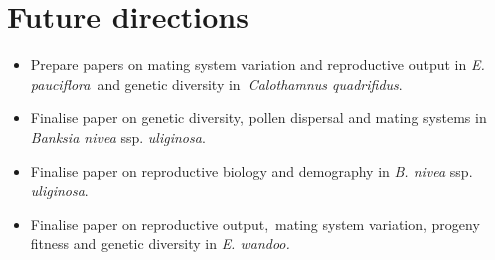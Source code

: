 \documentclass[version=last,
    paper=a4, %
    10pt, %
    usenames,
    dvipsnames,
    oneside, %
    headings=openany, %
    DIV=15 %
]{scrbook}
\begin{document}
\section*{Future directions}
\begin{itemize}
\itemsep1pt\parskip0pt
\item
  Prepare papers on mating system variation and reproductive output in
  \emph{E. pauciflora}~and genetic diversity in~\emph{Calothamnus
  quadrifidus}.
\item
  Finalise paper on genetic diversity, pollen dispersal and mating
  systems in \emph{Banksia nivea} ssp. \emph{uliginosa}.
\item
  Finalise paper on reproductive biology and demography in \emph{B.
  nivea} ssp. \emph{uliginosa}.
\item
  Finalise paper on reproductive output,~mating system variation,
  progeny fitness and genetic diversity in \emph{E. wandoo.}
\end{itemize}



\end{document}
